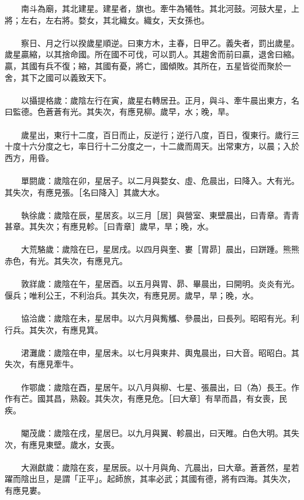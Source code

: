 　　南斗為廟，其北建星。建星者，旗也。牽牛為犧牲。其北河鼓。河鼓大星，上將；左右，左右將。婺女，其北織女。織女，天女孫也。
\\\\
　　察日、月之行以揆歲星順逆。曰東方木，主春，日甲乙。義失者，罰出歲星。歲星贏縮，以其捨命國。所在國不可伐，可以罰人。其趨舍而前曰贏，退舍曰縮。贏，其國有兵不復；縮，其國有憂，將亡，國傾敗。其所在，五星皆從而聚於一舍，其下之國可以義致天下。
\\\\
　　以攝提格歲：歲陰左行在寅，歲星右轉居丑。正月，與斗、牽牛晨出東方，名曰監德。色蒼蒼有光。其失次，有應見柳。歲早，水；晚，旱。
\\\\
　　歲星出，東行十二度，百日而止，反逆行；逆行八度，百日，復東行。歲行三十度十六分度之七，率日行十二分度之一，十二歲而周天。出常東方，以晨；入於西方，用昏。
\\\\
　　單閼歲：歲陰在卯，星居子。以二月與婺女、虛、危晨出，曰降入。大有光。其失次，有應見張。［名曰降入］其歲大水。
\\\\
　　執徐歲：歲陰在辰，星居亥。以三月［居］與營室、東壁晨出，曰青章。青青甚章。其失次；有應見軫。［曰青章］歲早，旱；晚，水。
\\\\
　　大荒駱歲：歲陰在巳，星居戌。以四月與奎、婁［胃昴］晨出，曰跰踵。熊熊赤色，有光。其失次，有應見亢。
\\\\
　　敦牂歲：歲陰在午，星居酉。以五月與胃、昴、畢晨出，曰開明。炎炎有光。偃兵；唯利公王，不利治兵。其失次，有應見房。歲早，旱；晚，水。
\\\\
　　協洽歲：歲陰在未，星居申。以六月與觜觿、參晨出，曰長列。昭昭有光。利行兵。其失次，有應見箕。
\\\\
　　涒灘歲：歲陰在申，星居未。以七月與東井、輿鬼晨出，曰大音。昭昭白。其失次，有應見牽牛。
\\\\
　　作鄂歲：歲陰在酉，星居午。以八月與柳、七星、張晨出，曰（為）長王。作作有芒。國其昌，熟穀。其失次，有應見危。［曰大章］有旱而昌，有女喪，民疾。
\\\\
　　閹茂歲：歲陰在戌，星居巳。以九月與翼、軫晨出，曰天睢。白色大明。其失次，有應見東壁。歲水，女喪。
\\\\
　　大淵獻歲：歲陰在亥，星居辰。以十月與角、亢晨出，曰大章。蒼蒼然，星若躍而陰出旦，是謂「正平」。起師旅，其率必武；其國有德，將有四海。其失次，有應見婁。
